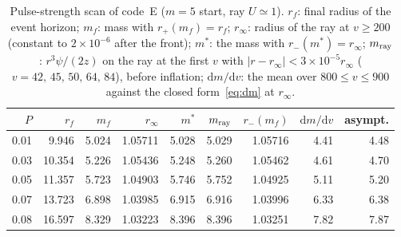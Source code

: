 \documentclass[11pt]{article}
\begin{document}
\begin{table}[ht]\centering\small
\begin{tabular}{rrrrrrrrr}
\hline
$P$ & $r_f$ & $m_f$ & $r_\infty$ & $m^{*}$ & $m_{\rm ray}$ & $r_-(m_f)$ & $\mathrm dm/\mathrm dv$ & asympt.\\
\hline
0.01 & 9.946 & 5.024 & 1.05711 & 5.028 & 5.029 & 1.05716 & 4.41 & 4.48\\
0.03 & 10.354 & 5.226 & 1.05436 & 5.248 & 5.260 & 1.05462 & 4.61 & 4.70\\
0.05 & 11.357 & 5.723 & 1.04903 & 5.746 & 5.752 & 1.04925 & 5.11 & 5.20\\
0.07 & 13.723 & 6.898 & 1.03985 & 6.915 & 6.916 & 1.03996 & 6.33 & 6.38\\
0.08 & 16.597 & 8.329 & 1.03223 & 8.396 & 8.396 & 1.03251 & 7.82 & 7.87\\
\hline
\end{tabular}
\caption{Pulse-strength scan of code~E ($m=5$ start, ray $U\simeq1$). $r_f$: final radius of the event horizon; $m_f$: mass with $r_+(m_f)=r_f$; $r_\infty$: radius of the ray at $v\ge200$ (constant to $2\times10^{-6}$ after the front); $m^{*}$: the mass with $r_-(m^{*})=r_\infty$; $m_{\rm ray}$: $r^{3}\psi/(2z)$ on the ray at the first $v$ with $|r-r_\infty|<3\times10^{-5}r_\infty$ ($v=42,\,45,\,50,\,64,\,84$), before inflation; $\mathrm dm/\mathrm dv$: the mean over $800\le v\le900$ against the closed form~\eqref{eq:dm} at $r_\infty$.}\label{tab:pscan}
\end{table}
\end{document}
